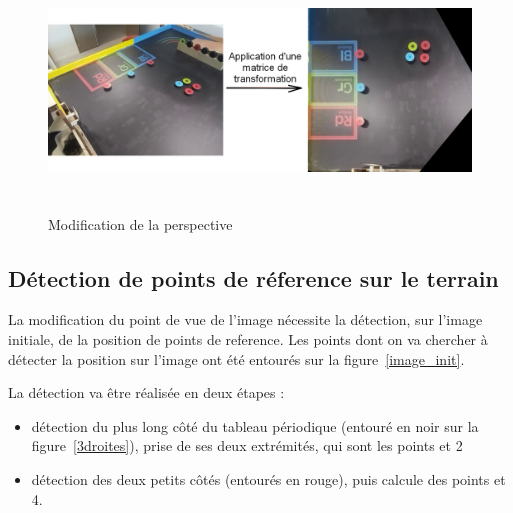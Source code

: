 \documentclass{article}
\begin{document}
\begin{figure}[!h]
	\begin{center} 
	\includegraphics[height=180pt]{application_matrice.png}  
	\end{center}
	\caption{Modification de la perspective}
	\label{application_matrice}
\end{figure}

\subsection{Détection de points de réference sur le terrain}
La modification du point de vue de l'image nécessite la détection, sur l'image initiale, de la position de points de reference. Les points dont on va chercher à 
détecter la position sur l'image ont été entourés sur la figure~\ref{image_init}.

La détection va être réalisée en deux étapes :
\begin{itemize}
\item détection du plus long côté du tableau périodique (entouré en noir sur la figure~\ref{3droites}), prise de ses deux extrémités, qui sont les points  et 2
\item détection des deux petits côtés (entourés en rouge), puis calcule des points  et 4.
\end{itemize}
\end{document}
